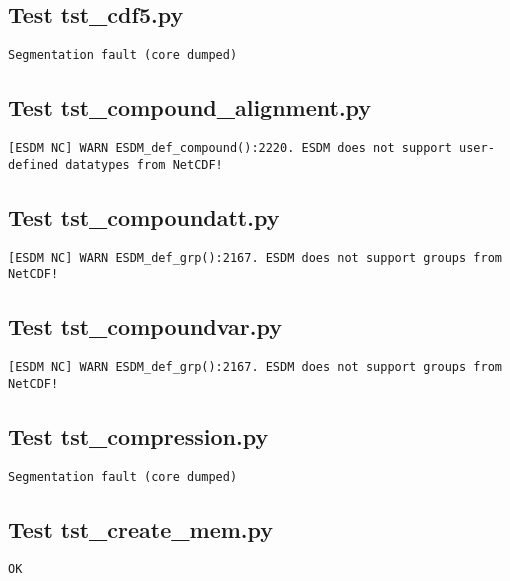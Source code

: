 \subsection{Test tst\_cdf5.py}

\begin{verbatim}
Segmentation fault (core dumped)
\end{verbatim}

\subsection{Test tst\_compound\_alignment.py}

\begin{verbatim}
[ESDM NC] WARN ESDM_def_compound():2220. ESDM does not support user-defined datatypes from NetCDF!
\end{verbatim}

\subsection{Test tst\_compoundatt.py}

\begin{verbatim}
[ESDM NC] WARN ESDM_def_grp():2167. ESDM does not support groups from NetCDF!
\end{verbatim}

\subsection{Test tst\_compoundvar.py}

\begin{verbatim}
[ESDM NC] WARN ESDM_def_grp():2167. ESDM does not support groups from NetCDF!
\end{verbatim}

\subsection{Test tst\_compression.py}

\begin{verbatim}
Segmentation fault (core dumped)
\end{verbatim}

\subsection{Test tst\_create\_mem.py}

\begin{verbatim}
OK
\end{verbatim}

